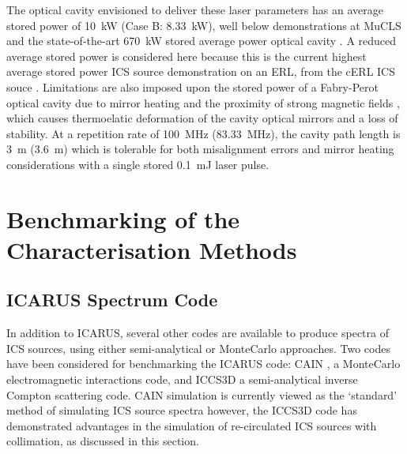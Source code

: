 \documentclass[../main.tex]{subfiles}
\begin{document}
The optical cavity envisioned to deliver these laser parameters has an average stored power of 10~\si{\kilo\watt} (Case B: 8.33~\si{\kilo\watt}), well below demonstrations at MuCLS \cite{eggl2016munich} and the state-of-the-art 670~\si{\kilo\watt} stored average power optical cavity \cite{carstens2014megawatt}. A reduced average stored power is considered here because this is the current highest average stored power ICS source demonstration on an ERL, from the cERL ICS souce \cite{akagi2016narrow}. Limitations are also imposed upon the stored power of a Fabry-Perot optical cavity due to mirror heating \cite{chaikovska2016high} and the proximity of strong magnetic fields \cite{gunther2019device}, which causes thermoelatic deformation of the cavity optical mirrors and a loss of stability. At a repetition rate of 100~\si{\mega\hertz} (83.33~\si{\mega\hertz}), the cavity path length is 3~\si{\meter} (3.6~\si{\meter})  which is tolerable for both misalignment errors \cite{zomer2009polarization} and mirror heating considerations with a single stored 0.1~\si{\milli\joule} laser pulse.  

\section{Benchmarking of the Characterisation Methods}
\label{sec:benchmarking_of_the_characterisation_methods}

\subsection{ICARUS Spectrum Code}
\label{sec:ICARUS_benchmarking}

In addition to \textsc{ICARUS}, several other codes are available to produce spectra of ICS sources, using either semi-analytical or MonteCarlo approaches. Two codes have been considered for benchmarking the \textsc{ICARUS} code: \textsc{CAIN} \cite{chen1995cain}, a MonteCarlo electromagnetic interactions code, and \textsc{ICCS3D} a semi-analytical inverse Compton scattering code. \textsc{CAIN} simulation is currently viewed as the `standard' method of simulating ICS source spectra however, the \textsc{ICCS3D} code has demonstrated advantages in the simulation of re-circulated ICS sources with collimation, as discussed in this section. 
\end{document}

